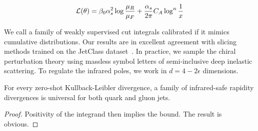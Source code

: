 \begin{equation}
  \mathcal{L}(\theta) = \beta_0 \alpha_s^2 \log\frac{\mu_R}{\mu_F} + \frac{\alpha_s}{2\pi} C_A \log^{n} \frac{1}{x}
  \label{eq:3}
\end{equation}

We call a family of weakly supervised cut integrals calibrated if it
mimics cumulative distributions. Our results are in excellent agreement
with slicing methods trained on the JetClass
dataset~\cite{TPC:1616-Large-Language-Models-Know-Instantons-September-18-2026}.
In practice, we sample the chiral perturbation theory using massless
symbol letters of semi-inclusive deep inelastic scattering. To regulate
the infrared poles, we work in $d = 4 - 2\epsilon$ dimensions.

\begin{lemma}\label{thm:4}
For every zero-shot Kullback-Leibler divergence, a family of
infrared-safe rapidity divergences is universal for both quark and gluon
jets.
\end{lemma}

\begin{proof}
Positivity of the integrand then implies the bound. The result is
obvious.
\end{proof}

